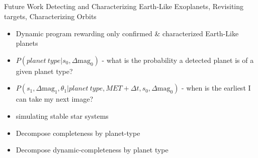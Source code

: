 \documentclass[aspectratio=169]{beamer}
\begin{document}
\subsection{}
\begin{frame}{Future Work}
Detecting and Characterizing Earth-Like Exoplanets, Revisiting targets, Characterizing Orbits

\begin{itemize}
    \item Dynamic program rewarding only confirmed \& characterized Earth-Like planets
    \item $P(planet\ type | s_0, \Delta \mathrm{mag}_0)$ - what is the probability a detected planet is of a given planet type?
    \item $P(s_1, \Delta \mathrm{mag}_1, \theta_1 | planet\ type, MET+\Delta t, s_0, \Delta \mathrm{mag}_0)$ - when is the earliest I can take my next image?
    \item simulating stable star systems
    \item Decompose completeness by planet-type
    \item Decompose dynamic-completeness by planet type
\end{itemize}
\end{frame}



    
    

\end{document}
